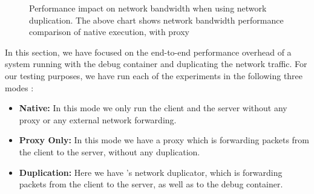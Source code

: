 \begin{figure}[ht]
	\centering
	\caption{Performance impact on network bandwidth when using network duplication. The above chart shows network bandwidth performance comparison of native execution, with proxy}
	\label{fig:performanceBandwidth}
\end{figure}

In this section, we have focused on the end-to-end performance overhead of a system running with the debug container and duplicating the network traffic.
For our testing purposes, we have run each of the experiments in the following three modes : 

\begin{itemize}
	\item \textbf{Native:} In this mode we only run the client and the server without any proxy or any external network forwarding. 
	\item \textbf{Proxy Only:} In this mode we have a proxy which is  forwarding packets from the client to the server, without any duplication. 
	\item \textbf{Duplication:} Here we have \parikshan's network duplicator, which is forwarding packets from the client to the server, as well as to the debug container.
\end{itemize}


